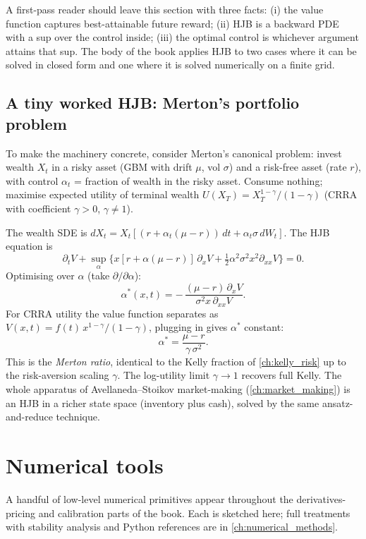 A first-pass reader should leave this section with three facts: (i) the
value function captures best-attainable future reward; (ii) HJB is a
backward PDE with a sup over the control inside; (iii) the optimal
control is whichever argument attains that sup. The body of the book
applies HJB to two cases where it can be solved in closed form and one
where it is solved numerically on a finite grid.

\subsection{A tiny worked HJB: Merton's portfolio problem}

To make the machinery concrete, consider Merton's canonical problem:
invest wealth $X_t$ in a risky asset (GBM with drift $\mu$, vol
$\sigma$) and a risk-free asset (rate $r$), with control $\alpha_t$ =
fraction of wealth in the risky asset. Consume nothing; maximise
expected utility of terminal wealth $U(X_T) = X_T^{1-\gamma}/(1-\gamma)$
(CRRA with coefficient $\gamma > 0$, $\gamma \ne 1$).

The wealth SDE is $dX_t = X_t[(r + \alpha_t(\mu-r))\, dt +
\alpha_t \sigma\, dW_t]$. The HJB equation is
\[
\partial_t V + \sup_\alpha\Big\{
x[r + \alpha(\mu-r)]\,\partial_x V
+ \tfrac{1}{2}\alpha^2 \sigma^2 x^2 \partial_{xx}V
\Big\} = 0.
\]
Optimising over $\alpha$ (take $\partial/\partial \alpha$):
\[
\alpha^*(x,t) = -\,\frac{(\mu-r)\,\partial_x V}{\sigma^2 x\, \partial_{xx}V}.
\]
For CRRA utility the value function separates as
$V(x,t) = f(t)\,x^{1-\gamma}/(1-\gamma)$, plugging in gives $\alpha^*$
constant:
\[
\alpha^* = \frac{\mu - r}{\gamma\,\sigma^2}.
\]
This is the \emph{Merton ratio}, identical to the Kelly fraction of
\cref{ch:kelly_risk} up to the risk-aversion scaling $\gamma$. The
log-utility limit $\gamma \to 1$ recovers full Kelly. The whole
apparatus of Avellaneda--Stoikov market-making (\cref{ch:market_making})
is an HJB in a richer state space (inventory plus cash), solved by the
same ansatz-and-reduce technique.

\section{Numerical tools}
\label{sec:app_math_numerics}

A handful of low-level numerical primitives appear throughout the
derivatives-pricing and calibration parts of the book. Each is sketched
here; full treatments with stability analysis and Python references are
in \cref{ch:numerical_methods}.

